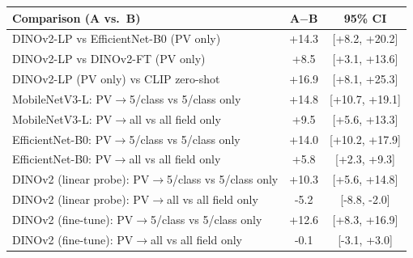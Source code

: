 \begin{tabular}{lcc}\toprule
Comparison (A vs.\ B) & A$-$B & 95\% CI \\\midrule
DINOv2-LP vs EfficientNet-B0 (PV only) & +14.3 & [+8.2, +20.2] \\
DINOv2-LP vs DINOv2-FT (PV only) & +8.5 & [+3.1, +13.6] \\
DINOv2-LP (PV only) vs CLIP zero-shot & +16.9 & [+8.1, +25.3] \\
MobileNetV3-L: PV$\rightarrow$5/class vs 5/class only & +14.8 & [+10.7, +19.1] \\
MobileNetV3-L: PV$\rightarrow$all vs all field only & +9.5 & [+5.6, +13.3] \\
EfficientNet-B0: PV$\rightarrow$5/class vs 5/class only & +14.0 & [+10.2, +17.9] \\
EfficientNet-B0: PV$\rightarrow$all vs all field only & +5.8 & [+2.3, +9.3] \\
DINOv2 (linear probe): PV$\rightarrow$5/class vs 5/class only & +10.3 & [+5.6, +14.8] \\
DINOv2 (linear probe): PV$\rightarrow$all vs all field only & -5.2 & [-8.8, -2.0] \\
DINOv2 (fine-tune): PV$\rightarrow$5/class vs 5/class only & +12.6 & [+8.3, +16.9] \\
DINOv2 (fine-tune): PV$\rightarrow$all vs all field only & -0.1 & [-3.1, +3.0] \\
\bottomrule\end{tabular}
